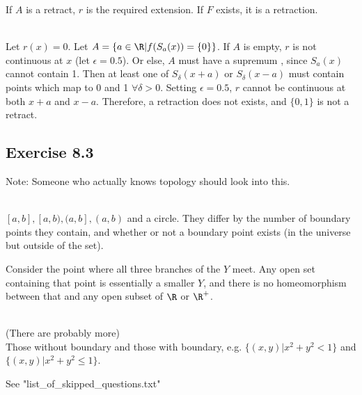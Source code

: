\begin{solution}
 If $A$ is a retract, $r$ is the required extension. If $F$ exists, it is a retraction.
\end{solution}


\begin{solution}
 \\Let $r(x) = 0$. Let $A = \{a \in \R|f(S_a(x)) = \{0\}\}$. If $A$ is empty, $r$ is not continuous at $x$ (let $\epsilon = 0.5$). Or else, $A$ must have a supremum , since $S_a(x)$ cannot contain 1. Then at least one of $S_\delta(x+a)$ or $S_\delta(x-a)$ must contain points which map to 0 and 1 $\forall \delta > 0$. Setting $\epsilon = 0.5$, $r$ cannot be continuous at both $x+a$ and $x-a$. Therefore, a retraction does not exists, and $\{0,1\}$ is not a retract.
\end{solution}

\subsection{Exercise 8.3}
\setcounter{question}{0}

Note: Someone who actually knows topology should look into this.


\begin{solution}
 \\$[a,b], [a,b), (a,b], (a,b)$ and a circle. They differ by the number of boundary points they contain, and whether or not a boundary point exists (in the universe but outside of the set).
\end{solution}


\begin{solution}
 Consider the point where all three branches of the $Y$ meet. Any open set containing that point is essentially a smaller $Y$, and there is no homeomorphism between that and any open subset of $\R$ or $\R^+$.
\end{solution}


\begin{solution}
 \\(There are probably more) \\
 Those without boundary and those with boundary, e.g. $\{(x,y)|x^2 + y^2 < 1\}$ and $\{(x,y)|x^2 + y^2 \leq 1\}$.
\end{solution}


\begin{solution}
See "list\_of\_skipped\_questions.txt"
\end{solution}
